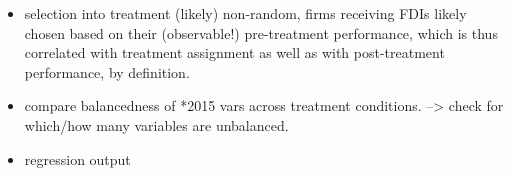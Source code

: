\documentclass[11pt,a4paper,leqno]{article}
\begin{document}
\begin{itemize}
	\item selection into treatment (likely) non-random, firms receiving FDIs likely chosen based on their (observable!) pre-treatment performance, which is thus correlated with treatment assignment as well as with post-treatment performance, by definition. 
	\item compare balancedness of *2015 vars across treatment conditions.  --> check for which/how many variables are unbalanced.
	\item regression output


\end{itemize}
\end{document}
